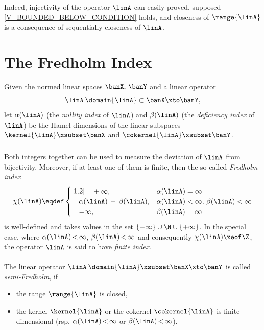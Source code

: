\documentclass[11pt,twoside]{article}
\begin{document}
Indeed,
injectivity of the operator $\linA$ can easily proved,
supposed \eqref{V_BOUNDED_BELOW_CONDITION} holds,
and closeness of $\range{\linA}$ is a consequence of sequentially closeness
of $\linA$.

\section{The Fredholm Index}
Given the normed linear spaces $\banX,\,\banY$ and
a linear operator
\[
\linA \: \domain{\linA} \subset \banX \xto \banY,
\]
let $\alpha(\linA)$ (the \textit{nullity index} of $\linA$)
and $\beta(\linA)$ (the \textit{deficiency index} of $\linA$)
be the Hamel dimensions of the linear subspaces
$\kernel{\linA} \xsubset \banX$ and $\cokernel{\linA} \xsubset \banY$.

\subparagraph{} %
Both integers together can be used
to measure the deviation of $\linA$ from bijectivity.
Moreover,
if at least one of them is finite,
then the so-called \textit{Fredholm index}
\[
\chi(\linA) \eqdef
\begin{cases}[1.2]
\quad + \infty, & \alpha(\linA) = \infty\\
\quad \alpha(\linA) \, - \, \beta(\linA), &
\alpha(\linA) < \infty, \, \beta(\linA) < \infty\\
\quad - \infty, & \beta(\linA) = \infty\\
\end{cases}
\]
is well-defined and takes values in the set
$\{- \infty\} \cup \N \cup \{+ \infty\}$.
In the special case,
where $\alpha(\linA) {\,<\,} \infty$,
$\beta(\linA) {\,<\,} \infty$
and consequently $\chi(\linA) \xeof \Z$,
the operator $\linA$ is said to have \textit{finite index}.

\paragraph{} %
The linear operator $\linA \: \domain{\linA} \xsubset \banX \xto \banY$
is called \textit{semi-Fredholm},
if
\begin{itemize}[leftmargin=12mm]
\item[(F-1)] the range $\range{\linA}$ is closed,
\item[(F-2)] the kernel $\kernel{\linA} $ or the cokernel $\cokernel{\linA} $
             is finite-dimensional
             (rsp. $\alpha(\linA) {\,<\,} \infty$ or
                   $\beta(\linA)  {\,<\,} \infty$).
\end{itemize}
\end{document}
